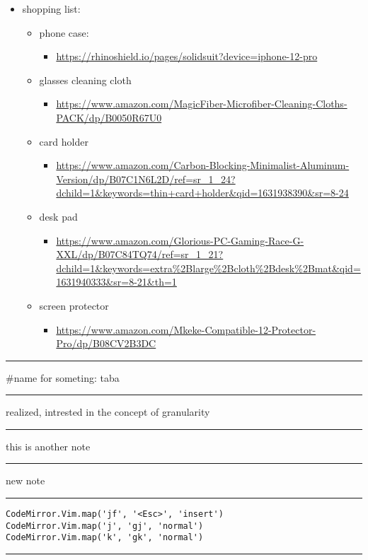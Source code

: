 \documentclass[letterpaper]{article}
\begin{document}
\begin{itemize}
\item shopping list:
\begin{itemize}
\item phone case:
\begin{itemize}
\item \url{https://rhinoshield.io/pages/solidsuit?device=iphone-12-pro}
\end{itemize}
\item glasses cleaning cloth
\begin{itemize}
\item \url{https://www.amazon.com/MagicFiber-Microfiber-Cleaning-Cloths-PACK/dp/B0050R67U0}
\end{itemize}
\item card holder
\begin{itemize}
\item \url{https://www.amazon.com/Carbon-Blocking-Minimalist-Aluminum-Version/dp/B07C1N6L2D/ref=sr\_1\_24?dchild=1\&keywords=thin+card+holder\&qid=1631938390\&sr=8-24}
\end{itemize}
\item desk pad
\begin{itemize}
\item \url{https://www.amazon.com/Glorious-PC-Gaming-Race-G-XXL/dp/B07C84TQ74/ref=sr\_1\_21?dchild=1\&keywords=extra\%2Blarge\%2Bcloth\%2Bdesk\%2Bmat\&qid=1631940333\&sr=8-21\&th=1}
\end{itemize}
\item screen protector
\begin{itemize}
\item \url{https://www.amazon.com/Mkeke-Compatible-12-Protector-Pro/dp/B08CV2B3DC}
\end{itemize}
\end{itemize}
\end{itemize}

\noindent\rule{\textwidth}{0.5pt}

\#name for someting: taba

\noindent\rule{\textwidth}{0.5pt}

realized, intrested in the concept of granularity

\noindent\rule{\textwidth}{0.5pt}

this is another note

\noindent\rule{\textwidth}{0.5pt}

new note

\noindent\rule{\textwidth}{0.5pt}

\begin{verbatim}
CodeMirror.Vim.map('jf', '<Esc>', 'insert')
CodeMirror.Vim.map('j', 'gj', 'normal')
CodeMirror.Vim.map('k', 'gk', 'normal')
\end{verbatim}

\noindent\rule{\textwidth}{0.5pt}
\end{document}
